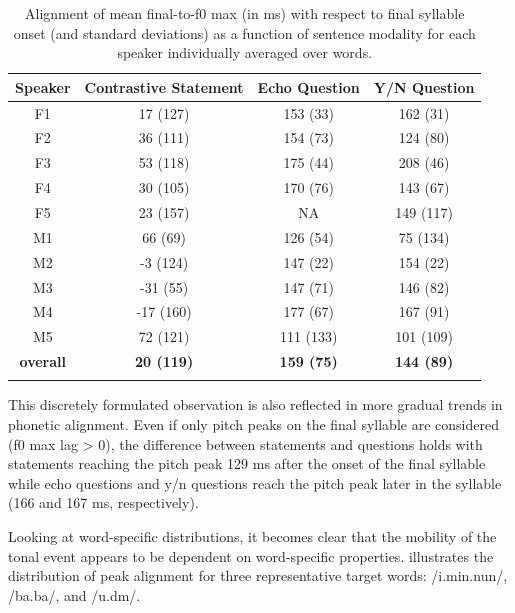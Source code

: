 \begin{table}
  \begin{tabular}{cccc}
    \lsptoprule
\textbf{Speaker} & \textbf{Contrastive Statement} & \textbf{Echo Question} & \textbf{Y/N Question} \\
    \midrule
F1 & 17 (127) & 153 (33) & 162 (31)\\
F2 & 36 (111) & 154 (73) & 124 (80)\\
F3 & 53 (118) & 175 (44) & 208 (46)\\
F4 & 30 (105) & 170 (76) & 143 (67)\\
F5 & 23 (157) & NA & 149 (117)\\
M1 & 66 (69) & 126 (54) & 75 (134)\\
M2 & -3 (124) & 147 (22) & 154 (22)\\
M3 & -31 (55) & 147 (71) & 146 (82)\\
M4 & -17 (160) & 177 (67) & 167 (91)\\
M5 & 72 (121) & 111 (133) & 101 (109)\\
\midrule
\textbf{overall} & \textbf{20 (119)} & \textbf{159 (75)} & \textbf{144 (89)}\\
 \lspbottomrule
  \end{tabular}
  \caption{Alignment of mean final-to-f0 max (in ms) with respect to final syllable onset (and standard deviations) as a function of sentence modality for each speaker individually averaged over words.}
  \label{tab:5.4}
\end{table}

This discretely formulated observation is also reflected in more gradual trends in phonetic alignment. Even if only pitch peaks on the final syllable are considered (f0 max lag > 0), the difference between statements and questions holds with statements reaching the pitch peak 129 ms after the onset of the final syllable while echo questions and y/n questions reach the pitch peak later in the syllable (166 and 167 ms, respectively).

Looking at word-specific distributions, it becomes clear that the mobility of the tonal event appears to be dependent on word-specific properties.  illustrates the distribution of peak alignment for three representative target words: /i.min.nun/, /ba.ba/, and /u.dm/.

